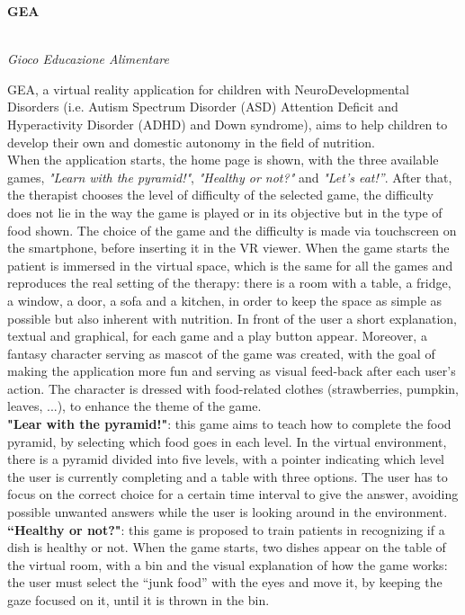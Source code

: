 \documentclass[a4paper, 12pt]{article}
\begin{document}
\begin{center}
\fontsize{12mm}{4mm}\selectfont\textbf{GEA}\\\
\end{center}
\begin{center}
\fontsize{7mm}{3mm}\selectfont\textit{Gioco Educazione Alimentare}
\end{center}
GEA, a virtual reality application for children with NeuroDevelopmental Disorders (i.e. Autism Spectrum Disorder (ASD) Attention Deficit and Hyperactivity Disorder (ADHD) and Down syndrome), aims to help children to develop their own and domestic autonomy in the field of nutrition.\\

When the application starts, the home page is shown, with the three available games, \textit{"Learn with the pyramid!"}, \textit{"Healthy or not?"} and \textit{"Let’s eat!”}. After that, the therapist chooses the level of difficulty of the selected game, the difficulty does not lie in the way the game is played or in its objective but in the type of food shown.  The choice of the game and the difficulty is made via touchscreen on the smartphone, before inserting it in the VR viewer. When the game starts the patient is immersed in the virtual space, which is the same for all the games and reproduces the real setting of the therapy: there is a room with a table, a fridge, a window, a door, a sofa and a kitchen, in order to keep the space as simple as possible but also inherent with nutrition. In front of the user a short explanation, textual and graphical,  for each game and a play button appear. Moreover, a fantasy character serving as mascot of the game was created, with the goal of making the application more fun and serving as visual feed-back after each user’s action. The character is dressed with food-related clothes (strawberries, pumpkin, leaves, ...), to enhance the theme of the game.\\

\textbf{"Lear with the pyramid!"}: this game aims to teach how to complete the food pyramid, by selecting which food goes in each level. In the virtual environment, there is a pyramid divided into five levels, with a pointer indicating which level the user is currently completing and a table with three options. The user has to focus on the correct choice for a certain time interval to give the answer, avoiding possible unwanted answers while the user is looking around in the environment. \\
\clearpage
\textbf{“Healthy or not?"}: this game is proposed to train patients in recognizing if a dish is healthy or not. When the game starts, two dishes appear on the table of the virtual room, with a bin and the visual explanation of how the game works: the user must select the “junk food” with the eyes and move it, by keeping the gaze focused on it, until it is thrown in the bin.\\
\end{document}
